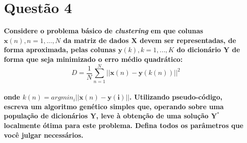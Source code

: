 \documentclass{report}
\begin{document}
\section*{Questão 4}

\textbf{Considere o problema básico de \textit{clustering} em que colunas $\mathbf{x}(n), n = 1,...,N$ da matriz de dados $\mathbf{X}$ devem ser representadas, de forma aproximada, pelas colunas $\mathbf{y}(k), k = 1,...,K$ do dicionário $\mathbf{Y}$ de forma que seja minimizado o erro médio quadrático:}\\

\begin{equation*}
D = \frac{1}{N} \sum_{n = 1}^{N}||\mathbf{x}(n) - \mathbf{y}(k(n))||^2
\end{equation*}\\

\textbf{onde $k(n) = argmin_i||\mathbf{x}(n) - \mathbf{y(i)}||$. Utilizando pseudo-código, escreva um algoritmo genético simples que, operando sobre uma população de dicionários $\mathbf{Y}$, leve à obtenção de uma solução $\mathbf{Y^*}$ localmente ótima para este problema. Defina todos os parâmetros que você julgar necessários.}\\

\paragraph{}
\end{document}
